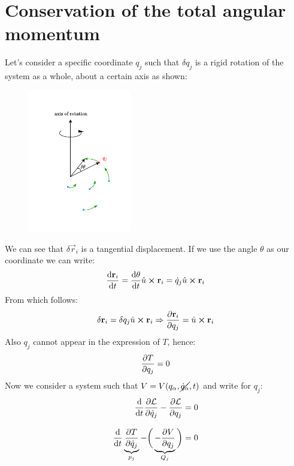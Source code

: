 \section{Conservation of the total angular momentum}
Let's consider a specific coordinate $q_j$ such that $\delta q_j$ is a rigid rotation of the system as a whole, about a certain axis as shown:
\begin{figure}[H]
    \centering
    \includegraphics[width=0.4\textwidth]{res/svg/collective_rotation.drawio}
\end{figure}
We can see that $\delta \vec{r}_i$ is a tangential displacement. If we use the angle $\theta$ as our coordinate we can write:
\begin{equation}
    \dv{\vec{r}_i}{t} = \dv{\theta}{t} \hat{u} \cross \vec{r}_i = \dot{q}_j \hat{u} \cross \vec{r}_i
\end{equation}
From which follows:
\begin{equation}
    \delta \vec{r}_i = \delta q_j \hat{u} \cross \vec{r}_i \Rightarrow \pdv{\vec{r}_i}{q_j} = \hat{u} \cross \vec{r}_i
\end{equation}
Also $q_j$ cannot appear in the expression of $T$, hence:
\begin{equation}
    \pdv{T}{q_j} = 0
\end{equation}
Now we consider a system such that $V = V(q_{\alpha},\cancel{\dot{q}_{\alpha}},t)$ and write \eleref\;for $q_j$:
\begin{equation} \label{e:ele_for_angular_momentum}
    \begin{split}
        \dv{}{t}\pdv{\lagr}{\dot{q}_j} - \pdv{\lagr}{q_j} = 0\\[8pt]
        \dv{}{t}\underbrace{\pdv{T}{\dot{q}_j}}_{p_j} - \bbrackets{\underbrace{- \pdv{V}{q_j}}_{Q_j}} = 0
    \end{split}
\end{equation}
